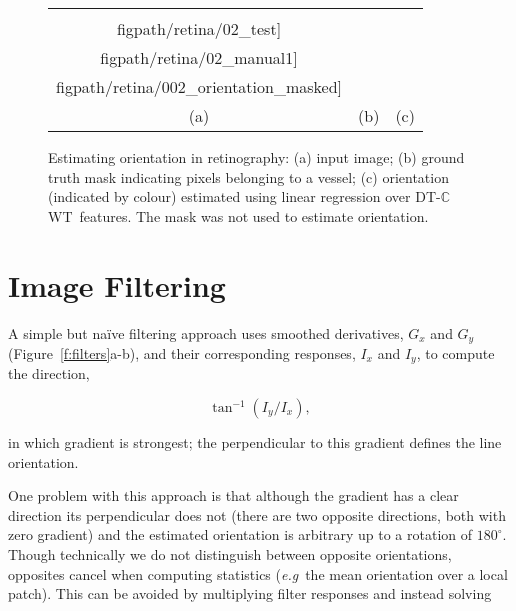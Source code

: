 \documentclass{bmvc2k}
\def\eg{\emph{e.g}\bmvaOneDot}
\newcommand{\fref}[1]{Figure~\ref{#1}}
\def\Gx{G_x}
\def\Gy{G_y}
\def\Ix{I_x}
\def\Iy{I_y}
\def\dtcwt{DT-$\mathbb{C}$WT}
\begin{document}
\begin{figure}[t]
\centering
\begin{tabular}{c c c}
\texttt{[image: \\figpath/retina/02\_test]} &
\texttt{[image: \\figpath/retina/02\_manual1]} &
\texttt{[image: \\figpath/retina/002\_orientation\_masked]} \\
(a) & (b) & (c) \\
\end{tabular}
%
\caption{Estimating orientation in retinography: %
(a) input image; %
(b) ground truth mask indicating pixels belonging to a vessel; %
(c) orientation (indicated by colour) estimated using linear regression over \dtcwt~features. The mask was not used to estimate orientation. %
}
\label{f:retinography}
\end{figure}


\section{Image Filtering}
\label{s:filtering}
A simple but na\"ive filtering approach uses smoothed derivatives, $\Gx$ and $\Gy$ (\fref{f:filters}a-b), and their corresponding responses, $\Ix$ and $\Iy$, to compute the direction,

\begin{equation}
\tan^{-1}(\Iy/\Ix),
\label{e:1d}
\end{equation}

\noindent in which gradient is strongest; the perpendicular to this gradient defines the line orientation.


One problem with this approach is that although the gradient has a clear direction its perpendicular does not (there are two opposite directions, both with zero gradient) and the estimated orientation is arbitrary up to a rotation of $180^\circ$. Though technically we do not distinguish between opposite orientations, opposites cancel when computing statistics (\eg~the mean orientation over a local patch). This can be avoided by multiplying filter responses and instead solving
\end{document}
